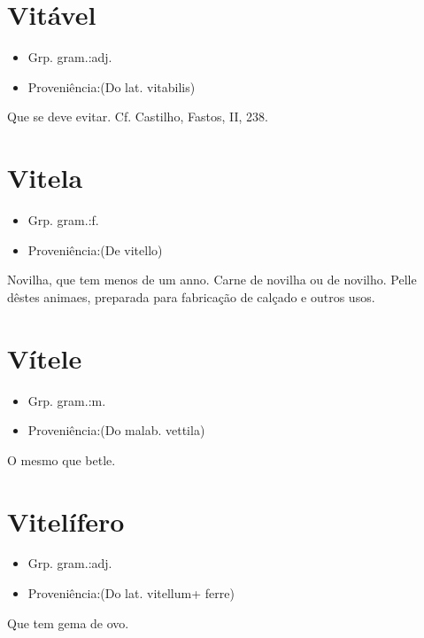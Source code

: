\documentclass{article}
\begin{document}
\section{Vitável}
\begin{itemize}
\item {Grp. gram.:adj.}
\end{itemize}
\begin{itemize}
\item {Proveniência:(Do lat. \textunderscore vitabilis\textunderscore )}
\end{itemize}
Que se deve evitar. Cf. Castilho, \textunderscore Fastos\textunderscore , II, 238.
\section{Vitela}
\begin{itemize}
\item {Grp. gram.:f.}
\end{itemize}
\begin{itemize}
\item {Proveniência:(De \textunderscore vitello\textunderscore )}
\end{itemize}
Novilha, que tem menos de um anno.
Carne de novilha ou de novilho.
Pelle dêstes animaes, preparada para fabricação de calçado e outros usos.
\section{Vítele}
\begin{itemize}
\item {Grp. gram.:m.}
\end{itemize}
\begin{itemize}
\item {Proveniência:(Do malab. \textunderscore vettila\textunderscore )}
\end{itemize}
O mesmo que \textunderscore betle\textunderscore .
\section{Vitelífero}
\begin{itemize}
\item {Grp. gram.:adj.}
\end{itemize}
\begin{itemize}
\item {Proveniência:(Do lat. \textunderscore vitellum\textunderscore  + \textunderscore ferre\textunderscore )}
\end{itemize}
Que tem gema de ovo.
\end{document}

